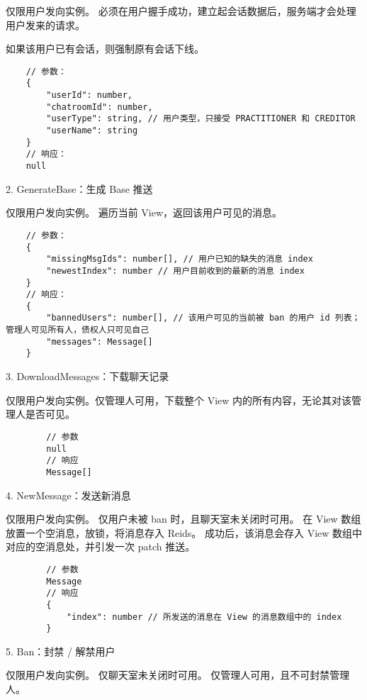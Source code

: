   仅限用户发向实例。
  必须在用户握手成功，建立起会话数据后，服务端才会处理用户发来的请求。

  如果该用户已有会话，则强制原有会话下线。

  {\setmainfont{Courier New Bold}
  \begin{lstlisting}
    // 参数：
    {
        "userId": number,
        "chatroomId": number,
        "userType": string, // 用户类型，只接受 PRACTITIONER 和 CREDITOR
        "userName": string
    }
    // 响应：
    null
   \end{lstlisting}}

   2. GenerateBase：生成 Base 推送

   仅限用户发向实例。
   遍历当前 View，返回该用户可见的消息。

   {\setmainfont{Courier New Bold}
   \begin{lstlisting}
    // 参数：
    {
        "missingMsgIds": number[], // 用户已知的缺失的消息 index
        "newestIndex": number // 用户目前收到的最新的消息 index
    }
    // 响应：
    {
        "bannedUsers": number[], // 该用户可见的当前被 ban 的用户 id 列表；管理人可见所有人，债权人只可见自己
        "messages": Message[]
    }
    \end{lstlisting}}

    3. DownloadMessages：下载聊天记录

    仅限用户发向实例。仅管理人可用，下载整个 View 内的所有内容，无论其对该管理人是否可见。
 
    {\setmainfont{Courier New Bold}
    \begin{lstlisting}
        // 参数
        null
        // 响应
        Message[]
     \end{lstlisting}}

     4. NewMessage：发送新消息

     仅限用户发向实例。
     仅用户未被 ban 时，且聊天室未关闭时可用。
     在 View 数组放置一个空消息，放锁，将消息存入 Reids。
     成功后，该消息会存入 View 数组中对应的空消息处，并引发一次 patch 推送。
  
     {\setmainfont{Courier New Bold}
     \begin{lstlisting}
        // 参数
        Message
        // 响应
        {
            "index": number // 所发送的消息在 View 的消息数组中的 index
        }
      \end{lstlisting}}

      5. Ban：封禁 / 解禁用户

      仅限用户发向实例。
仅聊天室未关闭时可用。
仅管理人可用，且不可封禁管理人。
   

